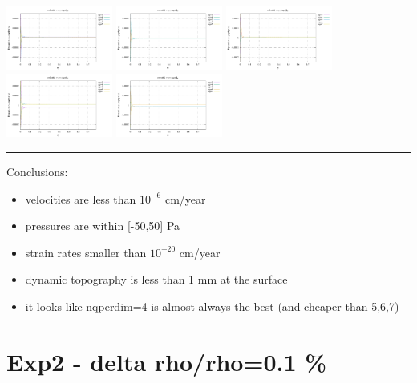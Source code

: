 \noindent
\includegraphics[width=3.5cm]{python_codes/fieldstone_152/RESULTS/exp1/d_t_128_m2}
\includegraphics[width=3.5cm]{python_codes/fieldstone_152/RESULTS/exp1/d_t_128_m3}
\includegraphics[width=3.5cm]{python_codes/fieldstone_152/RESULTS/exp1/d_t_128_m4}
\includegraphics[width=3.5cm]{python_codes/fieldstone_152/RESULTS/exp1/d_t_128_m5}
\includegraphics[width=3.5cm]{python_codes/fieldstone_152/RESULTS/exp1/d_t_128_m6}

\hrule

Conclusions:
\begin{itemize}
\item velocities are less than $10^{-6}$ cm/year 
\item pressures are within [-50,50] Pa
\item strain rates smaller than $10^{-20}$ cm/year 
\item dynamic topography is less than 1 mm at the surface 
\item it looks like nqperdim=4 is almost always the best (and cheaper than 5,6,7)
\end{itemize}



\newpage
\section*{Exp2 - delta rho/rho=0.1 \%}

